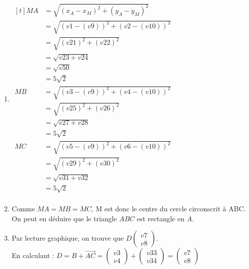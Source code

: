 \documentclass{article}%
\begin{document}
\begin{enumerate}
\item 
$\begin{aligned}[t]
MA &= \sqrt{(x_A-x_M)^2+(y_A-y_M)^2}\\
&=\sqrt{({v1}-({v9}))^2+({v2}-({v10}))^2}\\
&=\sqrt{({v21})^2+({v22})^2}\\
&=\sqrt{{v23}+{v24}}\\
&=\sqrt{v50}\\
&=5 \sqrt{2}\\
MB &= \sqrt{({v3}-({v9}))^2+({v4}-({v10}))^2}\\
&=\sqrt{({v25})^2+({v26})^2}\\
&=\sqrt{{v27}+{v28}}\\
&=5 \sqrt{2}\\
MC &= \sqrt{({v5}-({v9}))^2+({v6}-({v10}))^2}\\
&=\sqrt{({v29})^2+({v30})^2}\\
&=\sqrt{{v31}+{v32}}\\
&=5 \sqrt{2}\\
\end{aligned}$

\item Comme $MA = MB = MC$, M est donc le centre du cercle circonscrit à ABC. On peut en déduire que le triangle $ABC$ est rectangle en $A$.

\item Par lecture graphique, on trouve que $D\begin{pmatrix} {v7} \\ {v8} \end{pmatrix}$.\\
En calculant : $D=B+\overrightarrow{AC}=\begin{pmatrix} {v3} \\ {v4} \end{pmatrix}+\begin{pmatrix} {v33} \\ {v34} \end{pmatrix}=\begin{pmatrix} {v7} \\ {v8} \end{pmatrix}$

\end{enumerate}
\newpage
\end{document}
